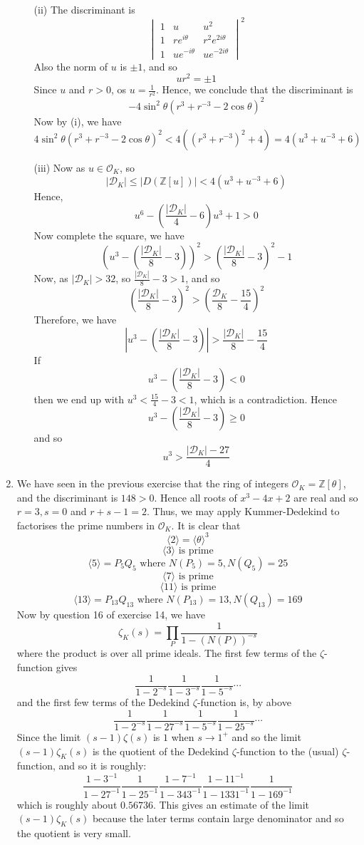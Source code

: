 \begin{enumerate}
\begin{enumerate}
\item[(ii)] The discriminant is
\begin{equation} \begin{vmatrix} 1&u&u^2\\1&re^{i\theta}&r^2e^{2i\theta}\\1&ue^{-i\theta}&ue^{-2i\theta}
\end{vmatrix}^2 \end{equation}
Also the norm of $u$ is $\pm 1$, and so
$$ur^2=\pm 1$$
Since $u$ and $r>0$, os $u=\frac{1}{r^2}$.
Hence, we conclude that the discriminant is
$$-4\sin^2{\theta}(r^3+r^{-3}-2\cos{\theta})^2$$
Now by (i), we have
$$4\sin^2{\theta}(r^3+r^{-3}-2\cos{\theta})^2<4((r^3+r^{-3})^2+4)=4(u^3+u^{-3}+6)$$
\item[(iii)] Now as $u \in \mathcal{O}_K$, so
$$|\mathcal{D}_K| \le |D(\mathbb{Z}[u])| <4(u^3+u^{-3}+6)$$
Hence,
$$u^6-\left(\frac{|\mathcal{D}_K|}{4}-6\right)u^3+1>0$$
Now complete the square, we have
$$\left(u^3-\left(\frac{|\mathcal{D}_K|}{8}-3\right)\right)^2>\left(\frac{|\mathcal{D}_K|}{8}-3\right)^2-1$$
Now, as $|\mathcal{D}_K|>32$, so $\frac{|\mathcal{D}_K|}{8}-3>1$, and so
$$\left(\frac{|\mathcal{D}_K|}{8}-3\right)^2 >\left(\frac{\mathcal{D}_K}{8}-\frac{15}{4}\right)^2$$
Therefore, we have
$$\left|u^3-\left(\frac{|\mathcal{D}_K|}{8}-3\right)\right|>\frac{|\mathcal{D}_K|}{8}-\frac{15}{4}$$
If $$u^3-\left(\frac{|\mathcal{D}_K|}{8}-3\right)<0$$ then we end up with $u^3<\frac{15}{4}-3<1$, which is a contradiction.
Hence $$u^3-\left(\frac{|\mathcal{D}_K|}{8}-3\right) \ge 0$$ and so
$$u^3>\frac{|\mathcal{D}_K|-27}{4}$$
\end{enumerate}
\item We have seen in the previous exercise that the ring of integers $\mathcal{O}_K=\mathbb{Z}[\theta]$, and the 
discriminant is $148>0$. Hence all roots of $x^3-4x+2$ are real and so $r=3,s=0$ and $r+s-1=2$.
Thus, we may apply Kummer-Dedekind to factorises the prime numbers in $\mathcal{O}_K$.
It is clear that 
$$\langle 2\rangle=\langle \theta \rangle^3$$
$$\langle 3 \rangle \text{ is prime}$$
$$\langle 5 \rangle=P_5Q_5 \text{ where } N(P_5)=5,N(Q_5)=25$$
$$\langle 7 \rangle \text{ is prime}$$
$$\langle 11 \rangle \text{ is prime}$$
$$\langle 13 \rangle=P_{13}Q_{13} \text{ where } N(P_{13})=13,N(Q_{13})=169$$
Now by question 16 of exercise 14, we have
$$\zeta_K(s)=\prod_{P} \frac{1}{1-(N(P))^{-s}}$$
where the product is over all prime ideals. 
The first few terms of the $\zeta$-function gives
$$\frac{1}{1-2^{-s}}\frac{1}{1-3^{-s}}\frac{1}{1-5^{-s}}\cdots$$
and the first few terms of the Dedekind $\zeta$-function is, by above
$$\frac{1}{1-2^{-s}}\frac{1}{1-27^{-s}}\frac{1}{1-5^{-s}}\frac{1}{1-25^{-s}}\cdots$$
Since the limit $(s-1)\zeta(s)$ is $1$ when $s \to 1^+$ and so the limit
$(s-1)\zeta_K(s)$ is the quotient of the Dedekind $\zeta$-function to the (usual) $\zeta$-function, and so
it is roughly:
$$\frac{1-3^{-1}}{1-27^{-1}}\frac{1}{1-25^{-1}}\frac{1-7^{-1}}{1-343^{-1}}\frac{1-11^{-1}}{1-1331^{-1}}
\frac{1}{1-169^{-1}}$$
which is roughly about $0.56736$. This gives an estimate of the limit $(s-1)\zeta_K(s)$ because
the later terms contain large denominator and so the quotient is very small. 


\end{enumerate}
